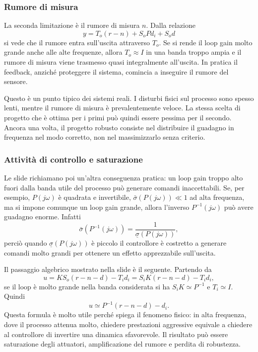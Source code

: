 \documentclass[11pt,a4paper]{article}
\begin{document}
\subsubsection{Rumore di misura}

La seconda limitazione è il rumore di misura $n$. Dalla relazione
$$
y = T_o(r-n) + S_o P d_i + S_o d
$$
si vede che il rumore entra sull'uscita attraverso $T_o$. Se si rende il loop gain molto grande anche alle alte frequenze, allora $T_o \approx I$ in una banda troppo ampia e il rumore di misura viene trasmesso quasi integralmente all'uscita. In pratica il feedback, anziché proteggere il sistema, comincia a inseguire il rumore del sensore.

Questo è un punto tipico dei sistemi reali. I disturbi fisici sul processo sono spesso lenti, mentre il rumore di misura è prevalentemente veloce. La stessa scelta di progetto che è ottima per i primi può quindi essere pessima per il secondo. Ancora una volta, il progetto robusto consiste nel distribuire il guadagno in frequenza nel modo corretto, non nel massimizzarlo senza criterio.

\subsubsection{Attività di controllo e saturazione}

Le slide richiamano poi un'altra conseguenza pratica: un loop gain troppo alto fuori dalla banda utile del processo può generare comandi inaccettabili. Se, per esempio, $P(j\omega)$ è quadrata e invertibile, $\bar{\sigma}(P(j\omega)) \ll 1$ ad alta frequenza, ma si impone comunque un loop gain grande, allora l'inverso $P^{-1}(j\omega)$ può avere guadagno enorme. Infatti
$$
\bar{\sigma}\!\left(P^{-1}(j\omega)\right)
= \frac{1}{\underline{\sigma}(P(j\omega))},
$$
perciò quando $\underline{\sigma}(P(j\omega))$ è piccolo il controllore è costretto a generare comandi molto grandi per ottenere un effetto apprezzabile sull'uscita.

Il passaggio algebrico mostrato nella slide è il seguente. Partendo da
$$
u = KS_o(r-n-d) - T_i d_i
= S_iK(r-n-d)-T_i d_i,
$$
se il loop è molto grande nella banda considerata si ha $S_iK\simeq P^{-1}$ e $T_i\simeq I$. Quindi
$$
u \simeq P^{-1}(r-n-d)-d_i.
$$
Questa formula è molto utile perché spiega il fenomeno fisico: in alta frequenza, dove il processo attenua molto, chiedere prestazioni aggressive equivale a chiedere al controllore di invertire una dinamica sfavorevole. Il risultato può essere saturazione degli attuatori, amplificazione del rumore e perdita di robustezza.
\end{document}

